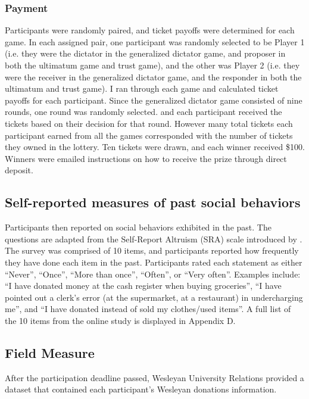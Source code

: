\documentclass[12pt]{article}
\begin{document}
\subsubsection{Payment}

Participants were randomly paired, and ticket payoffs were determined for each game. In each assigned pair, one participant was randomly selected to be Player 1 (i.e. they were the dictator in the generalized dictator game, and proposer in both the ultimatum game and trust game), and the other was Player 2 (i.e. they were the receiver in the generalized dictator game, and the responder in both the ultimatum and trust game). I ran through each game and calculated ticket payoffs for each participant. Since the generalized dictator game consisted of nine rounds, one round was randomly selected. and each participant received the tickets based on their decision for that round. However many total tickets each participant earned from all the games corresponded with the number of tickets they owned in the lottery. Ten tickets were drawn, and each winner received \$100. Winners were emailed instructions on how to receive the prize through direct deposit.

\subsection{Self-reported measures of past social behaviors}

Participants then reported on social behaviors exhibited in the past. The questions are adapted from the Self-Report Altruism (SRA) scale introduced by \cite{rushton_chrisjohn_fekken_1981}. The survey was comprised of 10 items, and participants reported how frequently they have done each item in the past. Participants rated each statement as either ``Never'', ``Once'', ``More than once'', ``Often'', or ``Very often''. Examples include: ``I have donated money at the cash register when buying groceries'', ``I have pointed out a clerk\rq s error (at the supermarket, at a restaurant) in undercharging me'', and ``I have donated instead of sold my clothes/used items''. A full list of the 10 items from the online study is displayed in Appendix D. 

\subsection{Field Measure}

After the participation deadline passed, Wesleyan University Relations provided a dataset that contained each participant\rq s Wesleyan donations information.
\end{document}
